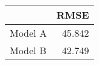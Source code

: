 
\begin{tabular}{l|r}
\hline
  & RMSE\\
\hline
Model A & 45.842\\
\hline
Model B & 42.749\\
\hline
\end{tabular}